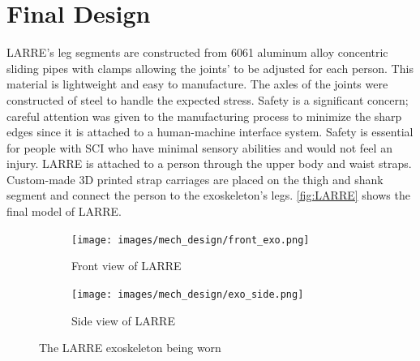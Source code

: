 \section{Final Design}

LARRE's leg segments are constructed from 6061 aluminum alloy concentric sliding pipes with clamps allowing the joints' to be adjusted for each person. This material is lightweight and easy to manufacture. The axles of the joints were constructed of steel to handle the expected stress. Safety is a significant concern; careful attention was given to the manufacturing process to minimize the sharp edges since it is attached to a human-machine interface system. Safety is essential for people with SCI who have minimal sensory abilities and would not feel an injury. LARRE is attached to a person through the upper body and waist straps. Custom-made 3D printed strap carriages are placed on the thigh and shank segment and connect the person to the exoskeleton's legs. \autoref{fig:LARRE} shows the final model of LARRE.     







\begin{figure}[htb]
\centering
    \begin{subfigure}[h]{0.495\textwidth}
        \texttt{[image: images/mech\_design/front\_exo.png]}
        \caption{Front view of LARRE}
        \label{fig:LARREFRONT}
    \end{subfigure}
        \begin{subfigure}[h]{0.495\textwidth}
        \texttt{[image: images/mech\_design/exo\_side.png]}
        \caption{Side view of LARRE}
        \label{fig:LARRESIDE}
    \end{subfigure}
\caption[The LARRE exoskeleton being worn]{The LARRE exoskeleton being worn}
\label{fig:LAREE}
\end{figure}



